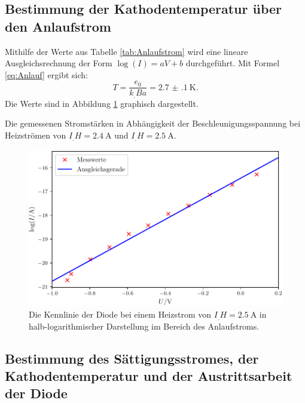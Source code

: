\subsection{Bestimmung der Kathodentemperatur über den Anlaufstrom}

Mithilfe der Werte aus Tabelle \ref{tab:Anlaufstrom} wird eine lineare Ausgleichsrechnung der Form $\log(I)=aV+b$ durchgeführt. Mit Formel \eqref{eq:Anlauf} ergibt sich:
\[
T = \frac{e_0}{k_.Ba} = \SI{2.7(1)}{\kelvin}\text{.}
\]
Die Werte sind in Abbildung \ref{fig:Anlaufstrom} graphisch dargestellt.

\begin{table}
\centering
\caption{Die gemessenen Stromstärken in Abhängigkeit der Beschleunigungsspannung bei Heizströmen von $I_.H=\SI{2,4}{\ampere}$ und $I_.H=\SI{2,5}{\ampere}$.}

\label{tab:Anlaufstrom}
\end{table}

\begin{figure}
\centering
\includegraphics[width=\linewidth-70pt,height=\textheight-70pt,keepaspectratio]{content/images/Anlaufstrom.pdf}
\caption{Die Kennlinie der Diode bei einem Heizstrom von $I_.H=\SI{2,5}{\ampere}$ in halb-logarithmischer Darstellung im Bereich des Anlaufstroms.}
\label{fig:Anlaufstrom}
\end{figure}

\subsection{Bestimmung des Sättigungsstromes, der Kathodentemperatur und der Austrittsarbeit der Diode}

